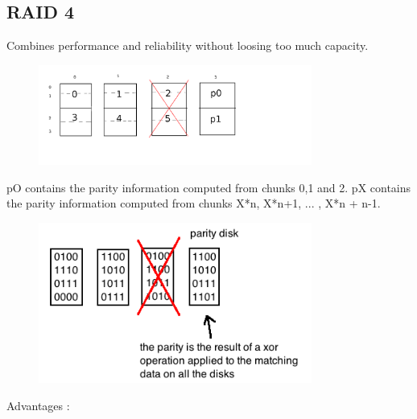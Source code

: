 \subsection{RAID 4}

Combines performance and reliability without loosing too much capacity.

\begin{figure}[h!]
  \begin{center}
    \includegraphics[width=0.8\textwidth]{raid_4.png}
    \caption{}
  \end{center}
\end{figure}

pO contains the parity information computed from chunks 0,1 and 2.
pX contains the parity information computed from chunks X*n, X*n+1, ... , X*n + n-1.

\begin{figure}[h!]
  \begin{center}
    \includegraphics[width=0.8\textwidth]{parity_disk.png}
    \caption{}
  \end{center}
\end{figure}

Advantages :

